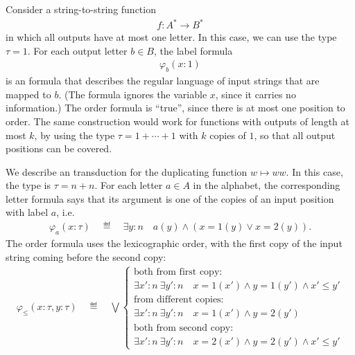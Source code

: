 \begin{myexample} Consider a string-to-string function 
    \begin{align*}
    f : A^* \to B^*
    \end{align*} 
    in which all outputs have at most one letter. In this case, we can use the type  $\tau = 1$. For each output letter $b \in B$, the label formula 
    \begin{align*}
    \varphi_b(x : 1)
    \end{align*}
    is an \mso formula that describes the regular language of input strings that are mapped to $b$. (The formula ignores the variable $x$, since it carries no information.) The order formula is ``true'', since there is at most one position to order. The same construction would work for functions with outputs of length at most $k$, by using the type $\tau = 1 + \cdots + 1$ with $k$ copies of $1$, so that all output positions can be covered.
\end{myexample}

\begin{myexample} 
    We describe an \mso transduction for the duplicating function $w \mapsto ww$. In this case, the  type is $\tau = n + n$. For each letter $a \in A$ in the alphabet, the corresponding letter formula says that its argument  is one of the copies of an input position with label $a$, i.e.
    \begin{align*}
   \varphi_a( x : \tau) \quad \eqdef \quad  \exists y : n \quad a(y) \land (x = 1(y)  \lor x = 2(y)).
    \end{align*}
    The order formula uses the lexicographic order, with the first copy of the input string coming before the second copy:
\begin{align*}
\varphi_\leq ( x : \tau, y : \tau) 
\quad \eqdef \quad  
\bigvee
\begin{cases}
    \text{both from first copy:} \\
    \exists x' : n \ \exists y' : n \quad x = 1(x') \land y = 1(y') \land x' \leq y' \\
    \text{from different copies:} \\
    \exists x' : n \ \exists y' : n \quad x = 1(x') \land y = 2(y') \\
    \text{both from second copy:} \\
    \exists x' : n \ \exists y' : n \quad x = 2(x') \land y = 2(y') \land x' \leq y' 
\end{cases}
\end{align*}    
\end{myexample}

